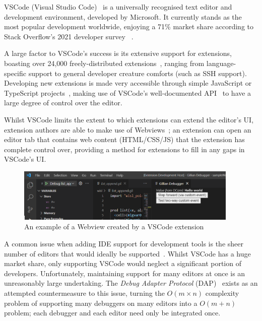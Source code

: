 VSCode (Visual Studio Code)~\cite{vscode} is a universally recognised text
editor and development environment, developed by Microsoft. It currently stands
as the most popular development worldwide, enjoying a 71\% market share
according to Stack Overflow's 2021 developer survey
~\cite{stack-overflow-survey-editors}.

A large factor to VSCode's success is its extensive support for extensions,
boasting over 24,000 freely-distributed extensions~\cite{vscode-popularity},
ranging from language-specific support to general developer creature comforts
(such as SSH support). Developing new extensions is made very accessible through
simple JavaScript or TypeScript projects~\cite{vscode-extensions-intro}, making
use of VSCode's well-documented API~\cite{vscode-api} to have a large degree of
control over the editor.

Whilst VSCode limits the extent to which extensions can extend the editor's UI,
extension authors are able to make use of Webviews~\cite{vscode-webview}; an
extension can open an editor tab that contains web content (HTML/CSS/JS) that
the extension has complete control over, providing a method for extensions to
fill in any gaps in VSCode's UI.

\begin{figure}
  \center
  \includegraphics[width=400px]{img/webview-example.png}
  \caption{An example of a Webview created by a VSCode extension}
  \label{fig:webview-example}
\end{figure}


A common issue when adding IDE support for development tools is the sheer
number of editors that would ideally be supported~\cite{magpiebridge}. Whilst
VSCode has a huge market share, only supporting VSCode would neglect a
significant portion of developers. Unfortunately, maintaining support for many
editors at once is an unreasonably large undertaking. The \textit{Debug Adapter
Protocol} (DAP)~\cite{dap} exists as an attempted countermeasure to this issue,
turning the $O(m \times n)$ complexity problem of supporting many debuggers on
many editors into a $O(m + n)$ problem; each debugger and each editor need only
be integrated once.

